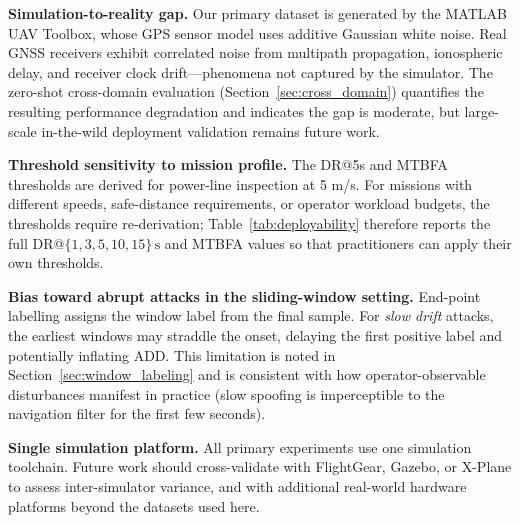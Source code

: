 \textbf{Simulation-to-reality gap.}
Our primary dataset is generated by the MATLAB UAV Toolbox, whose GPS sensor
model uses additive Gaussian white noise.
Real GNSS receivers exhibit correlated noise from multipath propagation,
ionospheric delay, and receiver clock drift—phenomena not captured by the simulator.
The zero-shot cross-domain evaluation (Section~\ref{sec:cross_domain}) quantifies
the resulting performance degradation and indicates the gap is moderate,
but large-scale in-the-wild deployment validation remains future work.

\textbf{Threshold sensitivity to mission profile.}
The DR@5s and MTBFA thresholds are derived for power-line inspection at 5 m/s.
For missions with different speeds, safe-distance requirements, or operator
workload budgets, the thresholds require re-derivation;
Table~\ref{tab:deployability} therefore reports the full DR@$\{1,3,5,10,15\}\,\text{s}$
and MTBFA values so that practitioners can apply their own thresholds.

\textbf{Bias toward abrupt attacks in the sliding-window setting.}
End-point labelling assigns the window label from the final sample.
For \emph{slow drift} attacks, the earliest windows may straddle the onset,
delaying the first positive label and potentially inflating ADD.
This limitation is noted in Section~\ref{sec:window_labeling} and is
consistent with how operator-observable disturbances manifest in practice
(slow spoofing is imperceptible to the navigation filter for the first few seconds).

\textbf{Single simulation platform.}
All primary experiments use one simulation toolchain.
Future work should cross-validate with FlightGear, Gazebo, or X-Plane to assess
inter-simulator variance, and with additional real-world hardware platforms
beyond the datasets used here.
